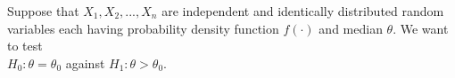 \iffalse
\chapter{2023}
\author{EE24BTECH11037}
\section{st}
\fi

    \item Suppose that $X_{1}, X_{2}, ..., X_{n}$ are independent and identically distributed random variables each having probability density function $f(\cdot)$ and median  $\theta.$ We want to test\\

$H_{0}: \theta = \theta_{0}$ against $H_{1}: \theta > \theta_{0}.$\\

